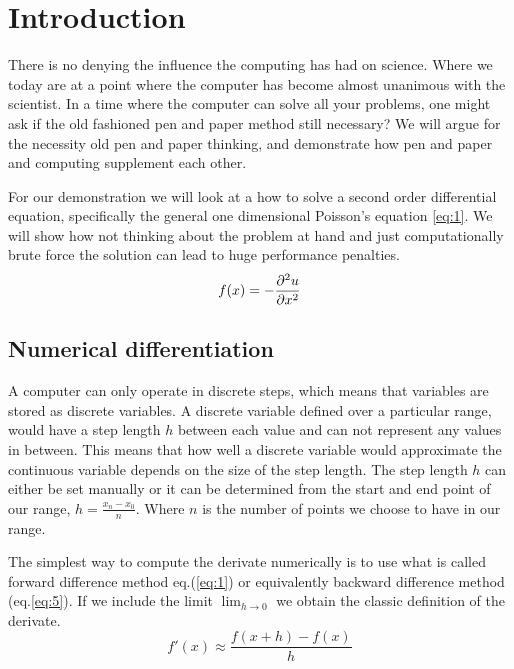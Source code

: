 \section*{Introduction}
There is no denying the influence the computing has had on science. Where we
today are at a point where the computer has become almost unanimous with the
scientist. In a time where the computer can solve all your problems, one might
ask if the old fashioned pen and paper method still necessary? We will argue for
the necessity old pen and paper thinking, and demonstrate how pen and paper and
computing supplement each other. 

For our demonstration we will look at a how to solve a second order
differential equation, specifically the general one dimensional Poisson's
equation \cref{eq:1}. We will show how not thinking about the problem at hand
and just computationally brute force  the solution can lead to huge performance
penalties.   
\begin{equation}\label{eq:2}
  f(x)= - \pd[^2u]{x^2}
\end{equation}

\subsection*{Numerical differentiation}
\par A computer can only operate in discrete steps, which means that variables
are stored as discrete variables. A discrete variable  defined over a particular
range, would 
have a step length $h$ between each value and can not represent any values in
between. This means that how well a discrete variable would approximate the
continuous variable depends on the size of the step length. The step length $h$
can either be set manually or it can be determined from the start and end
point of our range, $h = \frac{x_n -x_0}{n}$. Where $n$ is the number
of points we choose to have in our range. 
\par
The simplest way to compute the derivate numerically is to use what is called
forward difference method eq.(\ref{eq:1}) or equivalently backward difference
method (eq.\ref{eq:5}). If we include the limit $\lim_{h\to 0}$ we obtain the
classic definition of the derivate. 
\begin{equation}\label{eq:1}
    f'(x) \approx \frac{f(x+h)-f(x)}{h}
\end{equation}

